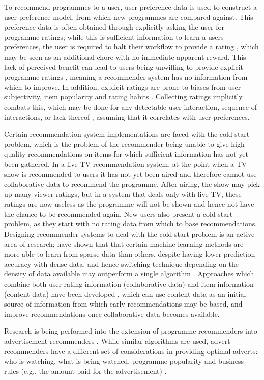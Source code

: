 	To recommend programmes to a user, user preference data is used to construct a user preference model, from which new programmes are compared against. This preference data is often obtained through explicitly asking the user for programme ratings; while this is sufficient information to learn a users preferences, the user is required to halt their workflow to provide a rating \citep{implicit_indicators}, which may be seen as an additional chore with no immediate apparent reward. This lack of perceived benefit can lead to users being unwilling to provide explicit programme ratings \citep{8_challenges}, meaning a recommender system has no information from which to improve. In addition, explicit ratings are prone to biases from user subjectivity, item popularity and rating habits \citep[p.~304]{recommender-systems-handbook}. Collecting ratings implicitly combats this, which may be done for any detectable user interaction, sequence of interactions, or lack thereof \citep{implicit_indicators}, assuming that it correlates with user preferences.

	Certain recommendation system implementations are faced with the cold start problem, which is the problem of the recommender being unable to give high-quality recommendations on items for which sufficient information has not yet been gathered. In a live TV recommendation system, at the point when a TV show is recommended to users it has not yet been aired and therefore cannot use collaborative data to recommend the programme. After airing, the show may pick up many viewer ratings, but in a system that deals only with live TV, these ratings are now useless as the programme will not be shown and hence not have the chance to be recommended again. New users also present a cold-start problem, as they start with no rating data from which to base recommendations. Designing recommender systems to deal with the cold start problem is an active area of research; \citep{cold-start-problem} have shown that that certain machine-learning methods are more able to learn from sparse data than others, despite having lower prediction accuracy with dense data, and hence switching technique depending on the density of data available may outperform a single algorithm . Approaches which combine both user rating information (collaborative data) and item information (content data) have been developed \citep{generative_models}, which can use content data as an initial source of information from which early recommendations may be based, and improve recommendations once collaborative data becomes available.

	Research is being performed into the extension of programme recommenders into advertisement recommenders \citep{contextual_advertising}. While similar algorithms are used, advert recommenders have a different set of considerations in providing optimal adverts: who is watching, what is being watched, programme popularity and business rules (e.g., the amount paid for the advertisement) \citep{contextual_advertising}.


